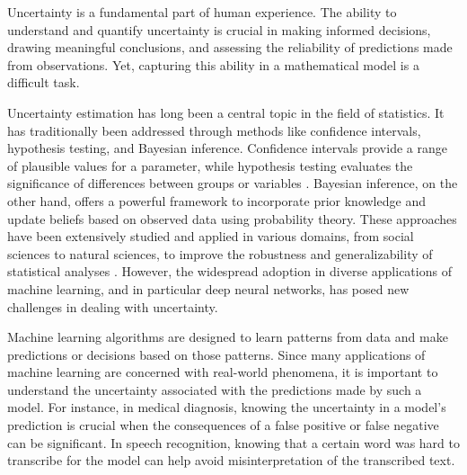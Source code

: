 






\iffalse


Uncertainty is a fundamental part of human experience. The ability to understand and quantify uncertainty is crucial in making informed decisions, drawing meaningful conclusions, and assessing the reliability of predictions made from observations. Yet, capturing this ability in a mathematical model is a difficult task. 

Uncertainty estimation has long been a central topic in the field of statistics. It has traditionally been addressed through methods like confidence intervals, hypothesis testing, and Bayesian inference. Confidence intervals provide a range of plausible values for a parameter, while hypothesis testing evaluates the significance of differences between groups or variables \cite{blitzstein_introduction_2019}. Bayesian inference, on the other hand, offers a powerful framework to incorporate prior knowledge and update beliefs based on observed data using probability theory. These approaches have been extensively studied and applied in various domains, from social sciences to natural sciences, to improve the robustness and generalizability of statistical analyses \cite{gelman_bayesian_2013}. However, the widespread adoption in diverse applications of machine learning, and in particular deep neural networks, has posed new challenges in dealing with uncertainty. 

Machine learning algorithms are designed to learn patterns from data and make predictions or decisions based on those patterns. Since many applications of machine learning are concerned with real-world phenomena, it is important to understand the uncertainty associated with the predictions made by such a model. For instance, in medical diagnosis, knowing the uncertainty in a model's prediction is crucial when the consequences of a false positive or false negative can be significant. In speech recognition, knowing that a certain word was hard to transcribe for the model can help avoid misinterpretation of the transcribed text.



